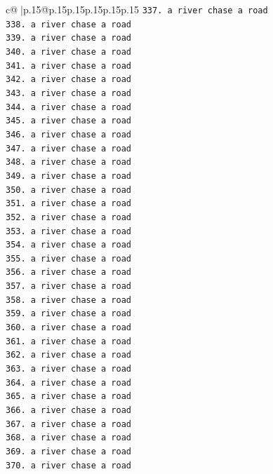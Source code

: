 \documentclass{article}
\begin{document}
{\begin{supertabular}{c@{$\;$}|p{.15\linewidth}@{}p{.15\linewidth}p{.15\linewidth}p{.15\linewidth}p{.15\linewidth}p{.15\linewidth}}
{{{\texttt{337. a river chase a road} \\
\texttt{338. a river chase a road} \\
\texttt{339. a river chase a road} \\
\texttt{340. a river chase a road} \\
\texttt{341. a river chase a road} \\
\texttt{342. a river chase a road} \\
\texttt{343. a river chase a road} \\
\texttt{344. a river chase a road} \\
\texttt{345. a river chase a road} \\
\texttt{346. a river chase a road} \\
\texttt{347. a river chase a road} \\
\texttt{348. a river chase a road} \\
\texttt{349. a river chase a road} \\
\texttt{350. a river chase a road} \\
\texttt{351. a river chase a road} \\
\texttt{352. a river chase a road} \\
\texttt{353. a river chase a road} \\
\texttt{354. a river chase a road} \\
\texttt{355. a river chase a road} \\
\texttt{356. a river chase a road} \\
\texttt{357. a river chase a road} \\
\texttt{358. a river chase a road} \\
\texttt{359. a river chase a road} \\
\texttt{360. a river chase a road} \\
\texttt{361. a river chase a road} \\
\texttt{362. a river chase a road} \\
\texttt{363. a river chase a road} \\
\texttt{364. a river chase a road} \\
\texttt{365. a river chase a road} \\
\texttt{366. a river chase a road} \\
\texttt{367. a river chase a road} \\
\texttt{368. a river chase a road} \\
\texttt{369. a river chase a road} \\
\texttt{370. a river chase a road} \\
}}}
\end{supertabular}}
\end{document}
